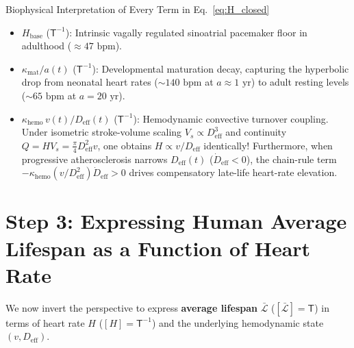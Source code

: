 \documentclass[11pt,a4paper]{article}
\newcommand{\dimbr}[1]{\left[#1\right]}
\newcommand{\Lbar}{\bar{\mathcal{L}}}
\newcommand{\Deff}{D_{\mathrm{eff}}}
\begin{document}
\begin{insightbox}{Biophysical Interpretation of Every Term in Eq.~\eqref{eq:H_closed}}
\begin{itemize}[leftmargin=1.4em,itemsep=2pt]
  \item $H_{\mathrm{base}}$ ($\mathsf{T}^{-1}$): Intrinsic vagally regulated sinoatrial pacemaker floor in adulthood ($\approx 47\text{ bpm}$).
  \item $\kappa_{\mathrm{mat}}/a(t)$ ($\mathsf{T}^{-1}$): Developmental maturation decay, capturing the hyperbolic drop from neonatal heart rates ($\sim 140\text{ bpm}$ at $a \approx 1\text{ yr}$) to adult resting levels ($\sim 65\text{ bpm}$ at $a = 20\text{ yr}$).
  \item $\kappa_{\mathrm{hemo}}\,v(t)/\Deff(t)$ ($\mathsf{T}^{-1}$): Hemodynamic convective turnover coupling. Under isometric stroke-volume scaling $V_s \propto \Deff^3$ and continuity $Q = H V_s = \frac{\pi}{4}\Deff^2 v$, one obtains $H \propto v/\Deff$ identically! Furthermore, when progressive atherosclerosis narrows $\Deff(t)$ ($\dot{D}_{\mathrm{eff}} < 0$), the chain-rule term $-\kappa_{\mathrm{hemo}}(v/\Deff^2)\dot{D}_{\mathrm{eff}} > 0$ drives compensatory late-life heart-rate elevation.
\end{itemize}
\end{insightbox}

\section{Step 3: Expressing Human Average Lifespan as a Function of Heart Rate}

We now invert the perspective to express \textbf{average lifespan} $\Lbar$ ($\dimbr{\Lbar} = \mathsf{T}$) in terms of heart rate $H$ ($\dimbr{H} = \mathsf{T}^{-1}$) and the underlying hemodynamic state $(v, \Deff)$.
\end{document}
